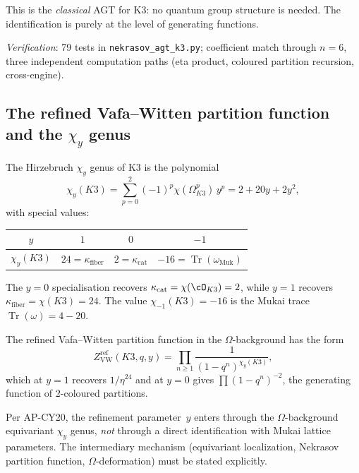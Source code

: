 \noindent This is the \emph{classical} AGT for K3: no quantum group structure is needed. The identification is purely at the level of generating functions.

\noindent\textit{Verification}: 79 tests in \texttt{nekrasov\_agt\_k3.py}; coefficient match through $n = 6$, three independent computation paths (eta product, coloured partition recursion, cross-engine).

\subsection{The refined Vafa--Witten partition function and the $\chi_y$ genus}
\label{subsec:k3e-refined-vw}

The Hirzebruch $\chi_y$ genus of K3 is the polynomial
\begin{equation}\label{eq:k3e-chi-y}
  \chi_y(K3) = \sum_{p=0}^{2} (-1)^p \chi(\Omega^p_{K3}) \, y^p
  = 2 + 20y + 2y^2,
\end{equation}
with special values:
\begin{center}
\begin{tabular}{c|ccc}
$y$ & $1$ & $0$ & $-1$ \\ \hline
$\chi_y(K3)$ & $24 = \kappa_{\mathrm{fiber}}$ & $2 = \kappa_{\mathrm{cat}}$ & $-16 = \operatorname{Tr}(\omega_{\mathrm{Muk}})$
\end{tabular}
\end{center}
The $y = 0$ specialisation recovers $\kappa_{\mathrm{cat}} = \chi(\cO_{K3}) = 2$, while $y = 1$ recovers $\kappa_{\mathrm{fiber}} = \chi(K3) = 24$.  The value $\chi_{-1}(K3) = -16$ is the Mukai trace $\operatorname{Tr}(\omega) = 4 - 20$.

The refined Vafa--Witten partition function in the $\Omega$-background has the form
\[
  Z_{\mathrm{VW}}^{\mathrm{ref}}(K3, q, y) = \prod_{n \geq 1} \frac{1}{(1 - q^n)^{\chi_y(K3)}},
\]
which at $y = 1$ recovers $1/\eta^{24}$ and at $y = 0$ gives $\prod(1-q^n)^{-2}$, the generating function of $2$-coloured partitions.

\begin{remark}
\label{rem:k3e-omega-background}
Per AP-CY20, the refinement parameter~$y$ enters through the $\Omega$-background equivariant $\chi_y$ genus, \emph{not} through a direct identification with Mukai lattice parameters. The intermediary mechanism (equivariant localization, Nekrasov partition function, $\Omega$-deformation) must be stated explicitly.
\end{remark}

